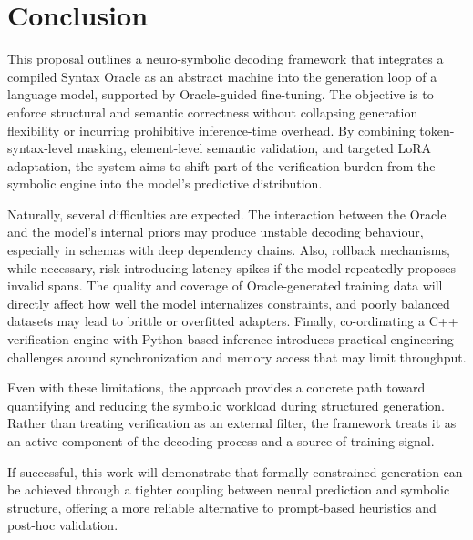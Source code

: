 \section{Conclusion}
This proposal outlines a neuro-symbolic decoding framework that integrates a
compiled Syntax Oracle as an abstract machine into the generation loop of a language 
model, supported by Oracle-guided fine-tuning. The objective is to enforce 
structural and semantic correctness without collapsing generation
flexibility or incurring prohibitive inference-time overhead. By combining
token-syntax-level masking, element-level semantic validation, and targeted LoRA
adaptation, the system aims to shift part of the verification burden from the
symbolic engine into the model's predictive distribution.

Naturally, several difficulties are expected. The interaction between the Oracle and the
model's internal priors may produce unstable decoding behaviour, especially in
schemas with deep dependency chains. Also, rollback mechanisms, while necessary, risk
introducing latency spikes if the model repeatedly proposes invalid spans. The
quality and coverage of Oracle-generated training data will directly affect how
well the model internalizes constraints, and poorly balanced datasets may lead
to brittle or overfitted adapters. Finally, co-ordinating a C++ verification
engine with Python-based inference introduces practical engineering challenges
around synchronization and memory access that may limit throughput.

Even with these limitations, the approach provides a concrete path toward
quantifying and reducing the symbolic workload during structured generation.
Rather than treating verification as an external filter, the framework treats it
as an active component of the decoding process and a source of training signal.

If successful, this work will demonstrate that formally constrained generation
can be achieved through a tighter coupling between neural prediction and
symbolic structure, offering a more reliable alternative to prompt-based
heuristics and post-hoc validation.